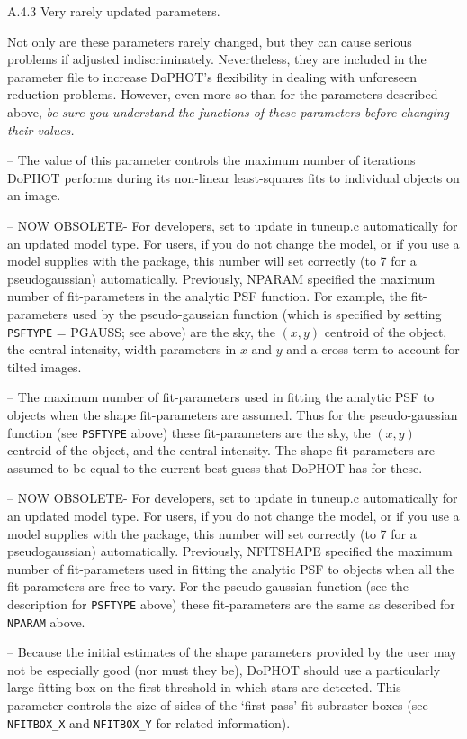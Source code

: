 \centerline{A.4.3  Very rarely updated parameters.}

Not only are these parameters rarely changed, but they can cause
serious problems if adjusted indiscriminately.  Nevertheless,
they are included in the parameter file to increase DoPHOT's
flexibility in dealing with unforeseen reduction problems.  
However, even more so than for the parameters described above,
{\it be sure you understand the functions of these parameters
before changing their values.}

 -- The value of this parameter controls
the maximum number of iterations DoPHOT performs during its
non-linear least-squares fits to individual objects on an
image.

 -- NOW OBSOLETE- For developers, set to update 
in tuneup.c automatically for an updated model type.  For users, if you do 
not change the model, or if you use a model supplies with the package, this 
number will set correctly (to 7 for a pseudogaussian) automatically. 
Previously, NPARAM specified the maximum 
number of fit-parameters in the analytic PSF function.  For example, the 
fit-parameters used by the pseudo-gaussian function (which is specified by 
setting {\tt PSFTYPE} = PGAUSS; see above) are the sky, the $(x,y)$ centroid 
of the object, the central intensity, width parameters in $x$ and $y$ and a
cross term to account for tilted images.

 -- The maximum number of fit-parameters used
in fitting the analytic PSF to objects when the shape fit-parameters
are assumed.  Thus for the pseudo-gaussian function (see
{\tt PSFTYPE} above) these fit-parameters are the sky, the $(x,y)$ centroid
of the object, and the central intensity.  The shape fit-parameters 
are assumed to be equal to the current best guess that DoPHOT has
for these.

 -- NOW OBSOLETE- For developers, set to update 
in tuneup.c automatically for an updated model type.  For users, if you do 
not change the model, or if you use a model supplies with the package, this 
number will set correctly (to 7 for a pseudogaussian) automatically. 
Previously, NFITSHAPE specified the maximum number of fit-parameters used
in fitting the analytic PSF to objects when all the fit-parameters are
free to vary.  For the pseudo-gaussian function (see the description
for {\tt PSFTYPE} above) these fit-parameters are the same as 
described for {\tt NPARAM} above.

 --  Because the initial estimates
of the shape parameters provided by the user may not be especially good
(nor must they be), DoPHOT
should use a particularly large fitting-box on the first threshold in which stars are
detected.  This parameter controls the size of sides of the `first-pass' 
fit subraster boxes (see {\tt NFITBOX\_X} and {\tt NFITBOX\_Y} for 
related information).

